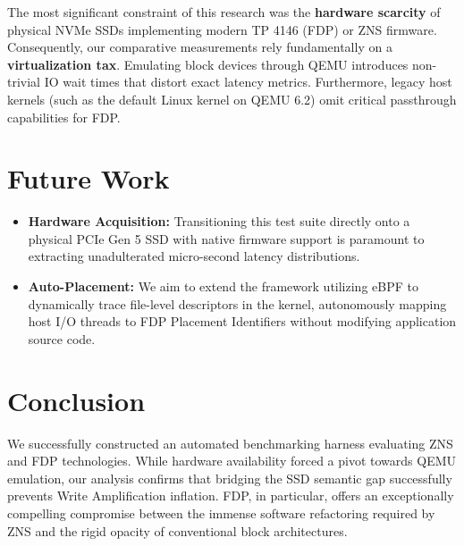 \documentclass[letterpaper,twocolumn,10pt]{article}
\begin{document}
The most significant constraint of this research was the \textbf{hardware scarcity} of physical NVMe SSDs implementing modern TP 4146 (FDP) or ZNS firmware. Consequently, our comparative measurements rely fundamentally on a \textbf{virtualization tax}. Emulating block devices through QEMU introduces non-trivial IO wait times that distort exact latency metrics. Furthermore, legacy host kernels (such as the default Linux kernel on QEMU 6.2) omit critical passthrough capabilities for FDP.

\section{Future Work}
\begin{itemize}
\item \textbf{Hardware Acquisition:} Transitioning this test suite directly onto a physical PCIe Gen 5 SSD with native firmware support is paramount to extracting unadulterated micro-second latency distributions.
\item \textbf{Auto-Placement:} We aim to extend the framework utilizing eBPF to dynamically trace file-level descriptors in the kernel, autonomously mapping host I/O threads to FDP Placement Identifiers without modifying application source code.
\end{itemize}

\section{Conclusion}
We successfully constructed an automated benchmarking harness evaluating ZNS and FDP technologies. While hardware availability forced a pivot towards QEMU emulation, our analysis confirms that bridging the SSD semantic gap successfully prevents Write Amplification inflation. FDP, in particular, offers an exceptionally compelling compromise between the immense software refactoring required by ZNS and the rigid opacity of conventional block architectures. 





\end{document}
